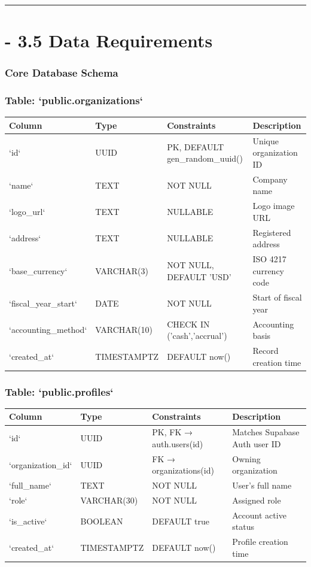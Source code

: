 \documentclass[journal, a4paper, onecolumn, 12pt]{IEEEtran}
\begin{document}
\vspace{1em}\hrule\vspace{1em}

\section{    - 3.5 Data Requirements}

\subsubsection{Core Database Schema}

\subsubsection{Table: `public.organizations`}
\begin{longtable}{|p{}|p{}|p{}|p{}|}
\hline
Column & Type & Constraints & Description \\ \hline
\hline
`id` & UUID & PK, DEFAULT gen\_random\_uuid() & Unique organization ID \\ \hline
`name` & TEXT & NOT NULL & Company name \\ \hline
`logo\_url` & TEXT & NULLABLE & Logo image URL \\ \hline
`address` & TEXT & NULLABLE & Registered address \\ \hline
`base\_currency` & VARCHAR(3) & NOT NULL, DEFAULT 'USD' & ISO 4217 currency code \\ \hline
`fiscal\_year\_start` & DATE & NOT NULL & Start of fiscal year \\ \hline
`accounting\_method` & VARCHAR(10) & CHECK IN ('cash','accrual') & Accounting basis \\ \hline
`created\_at` & TIMESTAMPTZ & DEFAULT now() & Record creation time \\ \hline
\end{longtable}
\subsubsection{Table: `public.profiles`}
\begin{longtable}{|p{}|p{}|p{}|p{}|}
\hline
Column & Type & Constraints & Description \\ \hline
\hline
`id` & UUID & PK, FK → auth.users(id) & Matches Supabase Auth user ID \\ \hline
`organization\_id` & UUID & FK → organizations(id) & Owning organization \\ \hline
`full\_name` & TEXT & NOT NULL & User's full name \\ \hline
`role` & VARCHAR(30) & NOT NULL & Assigned role \\ \hline
`is\_active` & BOOLEAN & DEFAULT true & Account active status \\ \hline
`created\_at` & TIMESTAMPTZ & DEFAULT now() & Profile creation time \\ \hline
\end{longtable}
\end{document}

